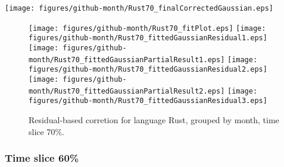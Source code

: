 \begin{center}
{\texttt{[image: figures/github-month/Rust70\_finalCorrectedGaussian.eps]}}
\end{center}

\FloatBarrier

\begin{figure}[t]
\centering
{}
{\texttt{[image: figures/github-month/Rust70\_fitPlot.eps]}}
{\texttt{[image: figures/github-month/Rust70\_fittedGaussianResidual1.eps]}}
{\texttt{[image: figures/github-month/Rust70\_fittedGaussianPartialResult1.eps]}}
{\texttt{[image: figures/github-month/Rust70\_fittedGaussianResidual2.eps]}}
{\texttt{[image: figures/github-month/Rust70\_fittedGaussianPartialResult2.eps]}}
{\texttt{[image: figures/github-month/Rust70\_fittedGaussianResidual3.eps]}}
\caption{Residual-based corretion for language Rust, grouped by month, time slice 70\%.}
\end{figure}


\FloatBarrier


\subsubsection{Time slice 60\%}

